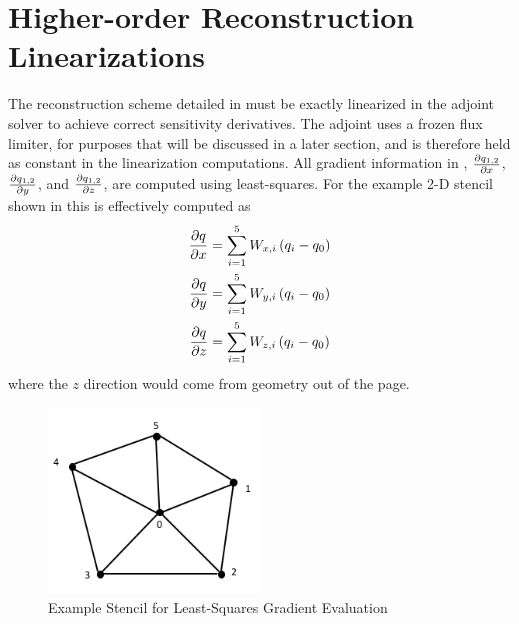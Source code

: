\section{Higher-order Reconstruction Linearizations}
\label{sec:higher-order-linerizations}

The reconstruction scheme detailed in  must
be exactly linearized in the adjoint solver to achieve correct sensitivity
derivatives. The adjoint uses a frozen flux limiter, for purposes that will be
discussed in a later section, and is therefore held as constant in the
linearization computations.  All gradient information in ,
$\frac{\partial q_{1,2}}{\partial x}$, $\frac{\partial q_{1,2}}{\partial y}$, and $\frac{\partial q_{1,2}}{\partial z}$, are computed using
least-squares.  For the example 2-D stencil shown in 
this is effectively computed as
\begin{equation}
  \begin{aligned}
    \frac{\partial q}{\partial x} &= \sum_{i=1}^{5}{W_{x,i}\left( q_i - q_0 \right)} \\
    \frac{\partial q}{\partial y} &= \sum_{i=1}^{5}{W_{y,i}\left( q_i - q_0 \right)} \\
    \frac{\partial q}{\partial z} &= \sum_{i=1}^{5}{W_{z,i}\left( q_i - q_0 \right)}
  \end{aligned}
  \label{grad-construction}
\end{equation}
where the $z$ direction would come from geometry out of the page.
\begin{figure}[h]
  \centering
  \includegraphics[width=0.5\textwidth]{figures/stencil.png}
  \caption{Example Stencil for Least-Squares Gradient Evaluation}
  \label{fig:lsq-gradients}
\end{figure}
